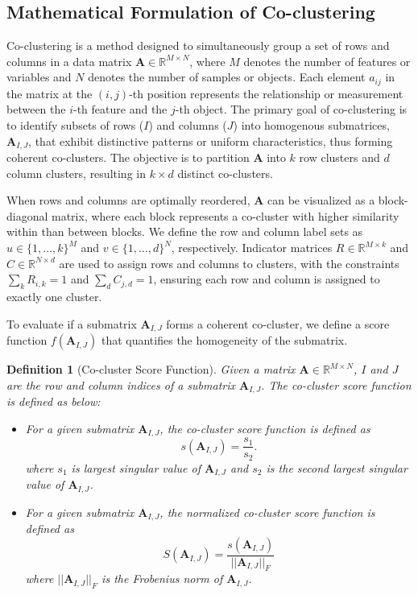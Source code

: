 \documentclass[journal]{IEEEtran}
\newtheorem{definition}{Definition}
\begin{document}
\subsection{Mathematical Formulation of Co-clustering}
Co-clustering is a method designed to simultaneously group a set of rows and columns in a data matrix $\mathbf{A} \in \mathbb{R}^{M \times N}$, where $M$ denotes the number of features or variables and $N$ denotes the number of samples or objects. Each element $a_{ij}$ in the matrix at the $(i, j)$-th position represents the relationship or measurement between the $i$-th feature and the $j$-th object. The primary goal of co-clustering is to identify subsets of rows ($I$) and columns ($J$) into homogenous submatrices, $\mathbf{A}_{I, J}$, that exhibit distinctive patterns or uniform characteristics, thus forming coherent co-clusters. The objective is to partition $\mathbf{A}$ into $k$ row clusters and $d$ column clusters, resulting in $k \times d$ distinct co-clusters.

When rows and columns are optimally reordered, $\mathbf{A}$ can be visualized as a block-diagonal matrix, where each block represents a co-cluster with higher similarity within than between blocks. We define the row and column label sets as \( u \in \{1,\dots,k\}^M \) and \( v \in \{1,\dots,d\}^N \), respectively. Indicator matrices \( R \in \mathbb{R}^{M \times k} \) and \( C \in \mathbb{R}^{N \times d} \) are used to assign rows and columns to clusters, with the constraints \( \sum_k R_{i,k} = 1 \) and \( \sum_d C_{j,d} = 1 \), ensuring each row and column is assigned to exactly one cluster.

To evaluate if a submatrix $\mathbf{A}_{I, J}$ forms a coherent co-cluster, we define a score function \( f(\mathbf{A}_{I, J}) \) that quantifies the homogeneity of the submatrix.

\begin{definition}[Co-cluster Score Function]
  \label{def:co_cluster}
  Given a matrix $\mathbf{A} \in \mathbb{R}^{M \times N}$, $I$ and $J$ are the row and column indices of a submatrix $\mathbf{A}_{I, J}$. The co-cluster score function is defined as below:
  \begin{itemize}
    \item For a given submatrix $\mathbf{A}_{I, J}$, the co-cluster score function is defined as
          $$s(\mathbf{A}_{I, J}) = \frac{s_1}{s_2}. $$ where $s_1$ is largest singular value of $\mathbf{A}_{I, J}$ and $s_2$ is the second largest singular value of $\mathbf{A}_{I, J}$.
    \item For a given submatrix $\mathbf{A}_{I, J}$, the normalized co-cluster score function is defined as
          $$S(\mathbf{A}_{I, J}) = \frac{s(\mathbf{A}_{I, J})}{||\mathbf{A}_{I, J}||_F} $$ where $||\mathbf{A}_{I, J}||_F$ is the Frobenius norm of $\mathbf{A}_{I, J}$.
  \end{itemize}
\end{definition}
\end{document}

